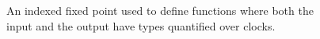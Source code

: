 \begin{figure}

\caption{An indexed fixed point used to define functions where both the input
  and the output have types quantified over clocks.}
\label{fig:pfix}
\end{figure}


